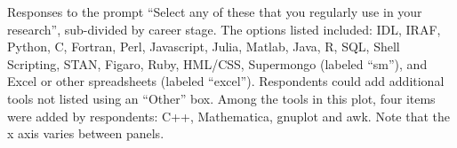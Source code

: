 \label{fig:stack1}

Responses to the prompt ``Select any of these that you regularly use in your research'', sub-divided by career stage.  The options listed included: IDL, IRAF, Python, C, Fortran, Perl, Javascript, Julia, Matlab, Java, R, SQL, Shell Scripting, STAN, Figaro, Ruby, HML/CSS, Supermongo (labeled ``sm''), and Excel or other spreadsheets (labeled ``excel'').  Respondents could add additional tools not listed using an ``Other'' box. Among the tools in this plot, four items were added by respondents: C++, Mathematica, gnuplot and awk. Note that the x axis varies between panels.
  
  
  
  